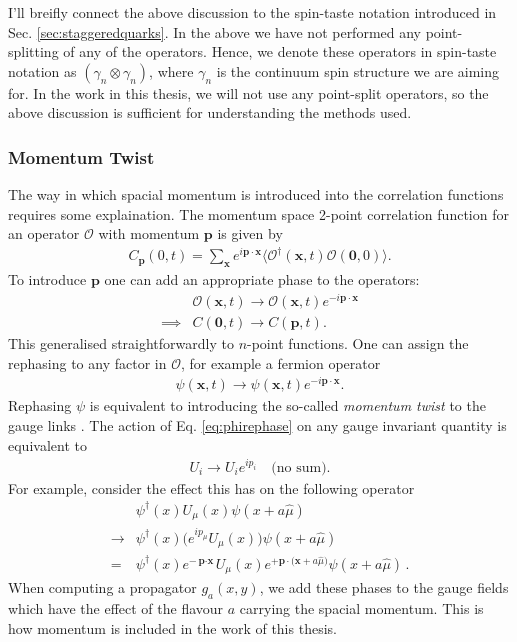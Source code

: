 I'll breifly connect the above discussion to the spin-taste notation introduced in Sec. \ref{sec:staggeredquarks}. In the above we have not performed any point-splitting of any of the operators. Hence, we denote these operators in spin-taste notation as $(\gamma_n\otimes \gamma_n)$, where $\gamma_n$ is the continuum spin structure we are aiming for. In the work in this thesis, we will not use any point-split operators, so the above discussion is sufficient for understanding the methods used.

\subsubsection{Momentum Twist}
\label{sec:momentum_twist}

The way in which spacial momentum is introduced into the correlation functions requires some explaination. The momentum space 2-point correlation function for an operator $\mathcal{O}$ with momentum ${\textbf{p}}$ is given by
\begin{align}
  C_{\textbf{p}}(0,t) = \sum_{{\textbf{x}}} e^{i{\textbf{p}}\cdot{\textbf{x}}} \langle \mathcal{O}^{\dagger} ({\textbf{x}},t) \mathcal{O}({\textbf{0}},0) \rangle.
\end{align}
To introduce ${\textbf{p}}$ one can add an appropriate phase to the operators:
\begin{align}
  \label{eq:phirephase}
  &\mathcal{O}({\textbf{x}},t) \rightarrow \mathcal{O}({\textbf{x}},t)e^{-i{\textbf{p}}\cdot{\textbf{x}}} \\
  \implies &C({\textbf{0}},t) \rightarrow C({\textbf{p}},t).
\end{align}
This generalised straightforwardly to $n$-point functions. One can assign the rephasing to any factor in $\mathcal{O}$, for example a fermion operator
\begin{align}
  \psi({\textbf{x}},t) \rightarrow \psi({\textbf{x}},t)e^{-i{\textbf{p}}\cdot{\textbf{x}}}.
\end{align}
Rephasing $\psi$ is equivalent to introducing the so-called {\it{momentum twist}} to the gauge links \cite{Guadagnoli:2005be}. The action of Eq. \eqref{eq:phirephase} on any gauge invariant quantity is equivalent to
\begin{align}
  U_i \rightarrow U_i e^{ip_i}\quad\text{(no sum)}.
  \label{eq:twist}
\end{align}
For example, consider the effect this has on the following operator
\begin{align}
  \nonumber
  &\psi^{\dagger}(x) U_{\mu}(x) \psi(x+a\hat{\mu}) \\
  \nonumber
  \rightarrow &\psi^{\dagger}(x) \big( e^{ip_{\mu}}U_{\mu}(x) \big) \psi(x+a\hat{\mu})
  \\
  = &\psi^{\dagger}(x)e^{-{\textbf{p}\cdot\textbf{x}}}U_{\mu}(x) e^{+{\textbf{p}\cdot(\textbf{x}}+a\hat{\mu})}\psi(x+a\hat{\mu})\,.
\end{align}
When computing a propagator $g_a(x,y)$, we add these phases to the gauge fields which have the effect of the flavour $a$ carrying the spacial momentum. This is how momentum is included in the work of this thesis.

